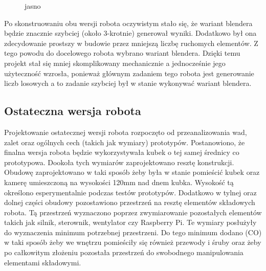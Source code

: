\begin{figure}[H]
    \centering
    \caption{\label{fig:jasno}jasno}
\end{figure}

Po skonstruowaniu obu wersji robota oczywistym stało się, że wariant blendera będzie znacznie szybciej (około 3-krotnie) generował wyniki. 
Dodatkowo był ona zdecydowanie prostszy w budowie przez mniejszą liczbę ruchomych elementów. Z tego powodu do docelowego robota wybrano 
wariant blendera. Dzięki temu projekt stał się mniej skomplikowany mechanicznie a jednocześnie jego użyteczność wzrosła, ponieważ
głównym zadaniem tego robota jest generowanie liczb losowych a to zadanie szybciej był w stanie wykonywać wariant blendera.

\subsection{Ostateczna wersja robota}
Projektowanie ostatecznej wersji robota rozpoczęto od przeanalizowania wad, zalet oraz ogólnych cech (takich jak wymiary) prototypów.
Postanowiono, że finalna wersja robota będzie wykorzystywała kubek o tej samej średnicy co prototypowa. Dookoła tych wymiarów zaprojektowano 
resztę konstrukcji. Obudowę zaprojektowano w taki sposób żeby była w stanie pomieścić
kubek oraz kamerę umieszczoną na wysokości 120mm nad dnem kubka. Wysokość tą określono esperymentalnie podczas testów prototypów.
Dodatkowo w tylnej oraz dolnej części obudowy pozostawiono przestrzeń na resztę
elementów składowych robota. Tą przestrzeń wyznaczono poprzez zwymiarowanie pozostałych elementów takich jak silnik, sterownik, wentylator 
czy Raspberry Pi. Te wymiary posłużyły do wyznaczenia minimum potrzebnej przestrzeni. Do tego minimum dodano (CO) w taki sposób
żeby we wnętrzu pomieściły się również przewody i śruby oraz żeby po całkowitym złożeniu pozostała przestrzeń do swobodnego manipulowania
elementami składowymi.

